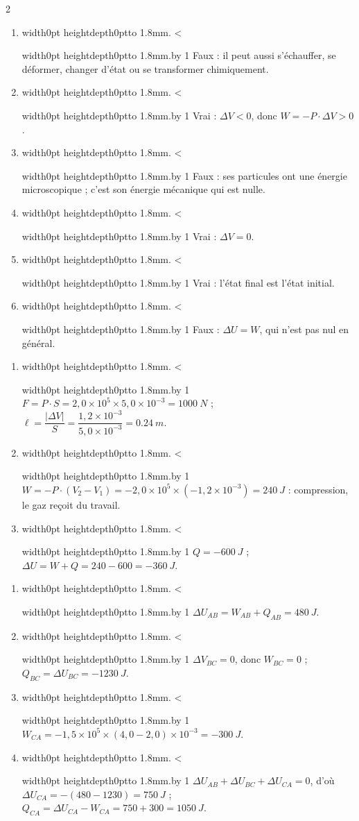 \documentclass[11pt,a4paper]{article}
\newif\ifeleve
\newlength{\interligne}\setlength{\interligne}{7mm}
\newlength{\replen}
\newcommand{\pointilles}{{\color{cInk2!60}\leaders\hbox to 1.8mm{\hss.\hss}\hfill}\kern0pt}
\newcommand{\lignes}[1]{\leavevmode\vrule width0pt height\dimexpr\interligne-1mm\relax depth0pt\pointilles
  \lgn=1 \loop\ifnum\lgn<#1 \par\nointerlineskip\noindent\vrule width0pt height\interligne depth0pt\pointilles\advance\lgn by 1 \repeat}
\newcommand{\rep}[1]{%
  \ifeleve
    \sbox{\repbox}{\parbox{\linewidth}{#1}}%
    \replen=\dimexpr\ht\repbox+\dp\repbox\relax
    \repn=\numexpr\replen/\baselineskip+1\relax
    \ifnum\repn<2 \repn=2\fi
    \edef\nblignes{\the\repn}\lignes{\nblignes}%
  \else #1\fi}
\begin{document}
\begin{multicols}{2}
\begin{enumerate}[label={\sffamily\bfseries\alph*)},leftmargin=5mm,itemsep=0pt]
  \item \rep{Faux : il peut aussi s’échauffer, se déformer, changer d’état ou se transformer chimiquement.}
  \item \rep{Vrai : $\Delta V < 0$, donc $W = -P\cdot\Delta V > 0$.}
  \item \rep{Faux : ses particules ont une énergie microscopique ; c’est son énergie mécanique qui est nulle.}
  \item \rep{Vrai : $\Delta V = 0$.}
  \item \rep{Vrai : l’état final est l’état initial.}
  \item \rep{Faux : $\Delta U = W$, qui n’est pas nul en général.}
\end{enumerate}

\begin{enumerate}[label={\sffamily\bfseries\arabic*.},leftmargin=5mm,itemsep=1pt]
  \item \rep{$F = P\cdot S = 2{,}0\times10^5\times5{,}0\times10^{-3} = \qty{1000}{N}$ ;\\ $\ell = \dfrac{|\Delta V|}{S} = \dfrac{1{,}2\times10^{-3}}{5{,}0\times10^{-3}} = \qty{0,24}{m}$.}
  \item \rep{$W = -P\cdot(V_2 - V_1) = -2{,}0\times10^5\times(-1{,}2\times10^{-3}) = \qty{+240}{J}$ : compression, le gaz reçoit du travail.}
  \item \rep{$Q = \qty{-600}{J}$ ; $\Delta U = W + Q = 240 - 600 = \qty{-360}{J}$.}
\end{enumerate}

\begin{enumerate}[label={\sffamily\bfseries\arabic*.},leftmargin=5mm,itemsep=1pt]
  \item \rep{$\Delta U_{AB} = W_{AB} + Q_{AB} = \qty{+480}{J}$.}
  \item \rep{$\Delta V_{BC} = 0$, donc $W_{BC} = 0$ ; $Q_{BC} = \Delta U_{BC} = \qty{-1230}{J}$.}
  \item \rep{$W_{CA} = -1{,}5\times10^5\times(4{,}0 - 2{,}0)\times10^{-3} = \qty{-300}{J}$.}
  \item \rep{$\Delta U_{AB} + \Delta U_{BC} + \Delta U_{CA} = 0$, d’où $\Delta U_{CA} = -(480 - 1230) = \qty{+750}{J}$ ;\\ $Q_{CA} = \Delta U_{CA} - W_{CA} = 750 + 300 = \qty{+1050}{J}$.}
\end{enumerate}


\end{multicols}
\end{document}
